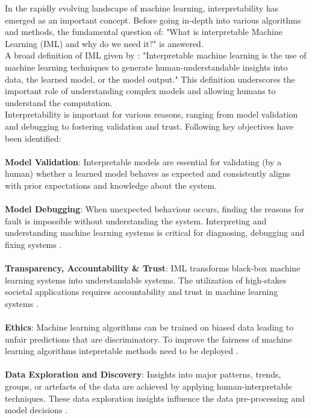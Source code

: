 In the rapidly evolving landscape of machine learning, interpretability has emerged as an important concept. Before going in-depth into various algorithms and methods, the fundamental question of: "What is interpretable Machine Learning (IML) and why do we need it?" is answered.
\\
A broad definition of IML given by \cite{allen2023interpretable}: "Interpretable machine learning is the use of machine learning techniques to generate human-understandable insights into data, the learned model, or the model output." This definition underscores the important role of understanding complex models and allowing humans to understand the computation.
\\
Interpretability is important for various reasons, ranging from model validation and debugging to fostering validation and trust. Following key objectives have been identified: \cite{murdoch2019definitions} \cite{Roscher2020explainable} \cite{molnar2022} \cite{guidotti2018survey} \cite{lipton2017mythos} \cite{du2019techniques} \cite{carvalho2019machine} \cite{doshivelez2017rigorous}
\\\\
\textbf{Model Validation}: Interpretable models are essential for validating (by a human) whether a learned model behaves as expected and consistently aligns with prior expectations and knowledge about the system.
\\\\
\textbf{Model Debugging}: When unexpected behaviour occurs, finding the reasons for fault is impossible without understanding the system. Interpreting and understanding machine learning systems is critical for diagnosing, debugging and fixing systems \cite{koh2020understanding}. 
\\\\
\textbf{Transparency, Accountability \& Trust}: IML transforms black-box machine learning systems into understandable systems. The utilization of high-stakes societal applications requires accountability and trust in machine learning systems \cite{rudin2019stop} \cite{Samek_2019} \cite{xu2019inbook}. 
\\\\
\textbf{Ethics}: Machine learning algorithms can be trained on biased data leading to unfair predictions that are discriminatory. To improve the fairness of machine learning algorithms intepretable methods need to be deployed \cite{guidotti2018survey}. 
\\\\
\textbf{Data Exploration and Discovery}: Insights into major patterns, trends, groups, or artefacts of the data are achieved by applying human-interpretable techniques. These data exploration insights influence the data pre-processing and model decisions \cite{murdoch2019definitions} \cite{berkhin2006} \cite{tukey1981}. 




